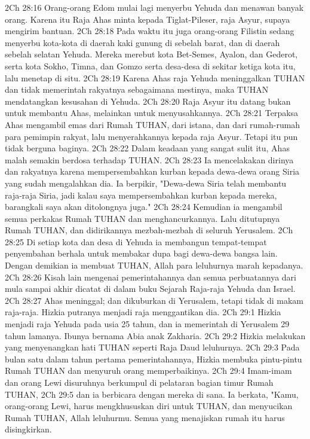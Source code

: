 2Ch 28:16  Orang-orang Edom mulai lagi menyerbu Yehuda dan menawan banyak orang. Karena itu Raja Ahas minta kepada Tiglat-Pileser, raja Asyur, supaya mengirim bantuan.
2Ch 28:18  Pada waktu itu juga orang-orang Filistin sedang menyerbu kota-kota di daerah kaki gunung di sebelah barat, dan di daerah sebelah selatan Yehuda. Mereka merebut kota Bet-Semes, Ayalon, dan Gederot, serta kota Sokho, Timna, dan Gomzo serta desa-desa di sekitar ketiga kota itu, lalu menetap di situ.
2Ch 28:19  Karena Ahas raja Yehuda meninggalkan TUHAN dan tidak memerintah rakyatnya sebagaimana mestinya, maka TUHAN mendatangkan kesusahan di Yehuda.
2Ch 28:20  Raja Asyur itu datang bukan untuk membantu Ahas, melainkan untuk menyusahkannya.
2Ch 28:21  Terpaksa Ahas mengambil emas dari Rumah TUHAN, dari istana, dan dari rumah-rumah para pemimpin rakyat, lalu menyerahkannya kepada raja Asyur. Tetapi itu pun tidak berguna baginya.
2Ch 28:22  Dalam keadaan yang sangat sulit itu, Ahas malah semakin berdosa terhadap TUHAN.
2Ch 28:23  Ia mencelakakan dirinya dan rakyatnya karena mempersembahkan kurban kepada dewa-dewa orang Siria yang sudah mengalahkan dia. Ia berpikir, "Dewa-dewa Siria telah membantu raja-raja Siria, jadi kalau saya mempersembahkan kurban kepada mereka, barangkali saya akan ditolongnya juga."
2Ch 28:24  Kemudian ia mengambil semua perkakas Rumah TUHAN dan menghancurkannya. Lalu ditutupnya Rumah TUHAN, dan didirikannya mezbah-mezbah di seluruh Yerusalem.
2Ch 28:25  Di setiap kota dan desa di Yehuda ia membangun tempat-tempat penyembahan berhala untuk membakar dupa bagi dewa-dewa bangsa lain. Dengan demikian ia membuat TUHAN, Allah para leluhurnya marah kepadanya.
2Ch 28:26  Kisah lain mengenai pemerintahannya dan semua perbuatannya dari mula sampai akhir dicatat di dalam buku Sejarah Raja-raja Yehuda dan Israel.
2Ch 28:27  Ahas meninggal; dan dikuburkan di Yerusalem, tetapi tidak di makam raja-raja. Hizkia putranya menjadi raja menggantikan dia.
2Ch 29:1  Hizkia menjadi raja Yehuda pada usia 25 tahun, dan ia memerintah di Yerusalem 29 tahun lamanya. Ibunya bernama Abia anak Zakharia.
2Ch 29:2  Hizkia melakukan yang menyenangkan hati TUHAN seperti Raja Daud leluhurnya.
2Ch 29:3  Pada bulan satu dalam tahun pertama pemerintahannya, Hizkia membuka pintu-pintu Rumah TUHAN dan menyuruh orang memperbaikinya.
2Ch 29:4  Imam-imam dan orang Lewi disuruhnya berkumpul di pelataran bagian timur Rumah TUHAN,
2Ch 29:5  dan ia berbicara dengan mereka di sana. Ia berkata, "Kamu, orang-orang Lewi, harus mengkhususkan diri untuk TUHAN, dan menyucikan Rumah TUHAN, Allah leluhurmu. Semua yang menajiskan rumah itu harus disingkirkan.
